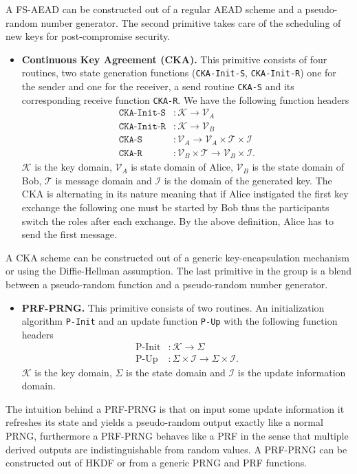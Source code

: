 \documentclass[11pt,a4paper,twoside,openright,bibliography=totoc]{scrbook}
\renewcommand{\t}{\text} %
\begin{document}
A FS-AEAD can be constructed out of a regular AEAD scheme and a pseudo-random
number generator. The second primitive takes care of the scheduling
of new keys for post-compromise security.
\begin{itemize}
\item \textbf{Continuous Key Agreement (CKA).} This primitive consists
  of four routines, two state generation functions (\texttt{CKA-Init-S}, \texttt{CKA-Init-R})
  one for the sender and one for the receiver, a send routine \texttt{CKA-S} and
  its corresponding receive function \texttt{CKA-R}. We have the following
  function headers
  \begin{align*}
    \texttt{CKA-Init-S} & : \mathcal{K} \rightarrow \mathcal{V}_A \\
    \texttt{CKA-Init-R} & : \mathcal{K} \rightarrow \mathcal{V}_B \\
    \texttt{CKA-S} & : \mathcal{V}_A \rightarrow
                \mathcal{V}_A \times \mathcal{T} \times \mathcal{I} \\
    \texttt{CKA-R} & : \mathcal{V}_B \times \mathcal{T} \rightarrow
                \mathcal{V}_B \times \mathcal{I}.
  \end{align*}
  $\mathcal{K}$ is the key domain, $\mathcal{V}_A$ is state domain of Alice,
  $\mathcal{V}_B$ is the state domain of Bob, $\mathcal{T}$
  is message domain and $\mathcal{I}$ is the domain of the generated key.
  The CKA is alternating in its nature meaning that if Alice instigated
  the first key exchange the following one must be started by Bob thus
  the participants switch the roles after each exchange. By the
  above definition, Alice has to send the first message.
\end{itemize}

A CKA scheme can be constructed out of a generic key-encapsulation
mechanism or using the Diffie-Hellman assumption. The last
primitive in the group is a blend between a pseudo-random function
and a pseudo-random number generator.
\begin{itemize}
\item \textbf{PRF-PRNG.} This primitive consists of two routines.
  An initialization algorithm \texttt{P-Init} and an update function \texttt{P-Up}
  with the following function headers
  \begin{align*}
    \t{P-Init} & : \mathcal{K} \rightarrow \Sigma \\
    \t{P-Up} & : \Sigma \times \mathcal{I} \rightarrow \Sigma \times \mathcal{I}.
  \end{align*}
  $\mathcal{K}$ is the key domain, $\Sigma$ is the state domain and
  $\mathcal{I}$ is the update information domain.
\end{itemize}
The intuition behind a PRF-PRNG is that on input some update information
it refreshes its state and yields a pseudo-random output exactly like
a normal PRNG, furthermore a PRF-PRNG behaves like a PRF in the sense
that multiple derived outputs are indistinguishable from random
values. A PRF-PRNG can be constructed out of HKDF or from
a generic PRNG and PRF functions.
\end{document}
